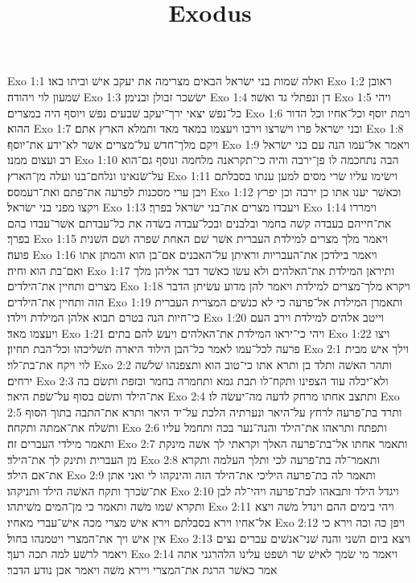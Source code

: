 

\title{Exodus}

Exo 1:1  ואלה שׁמות בני ישׂראל הבאים מצרימה את יעקב אישׁ וביתו באו׃
Exo 1:2  ראובן שׁמעון לוי ויהודה׃
Exo 1:3  ישׂשכר זבולן ובנימן׃
Exo 1:4  דן ונפתלי גד ואשׁר׃
Exo 1:5  ויהי כל־נפשׁ יצאי ירך־יעקב שׁבעים נפשׁ ויוסף היה במצרים׃
Exo 1:6  וימת יוסף וכל־אחיו וכל הדור ההוא׃
Exo 1:7  ובני ישׂראל פרו וישׁרצו וירבו ויעצמו במאד מאד ותמלא הארץ אתם׃
Exo 1:8  ויקם מלך־חדשׁ על־מצרים אשׁר לא־ידע את־יוסף׃
Exo 1:9  ויאמר אל־עמו הנה עם בני ישׂראל רב ועצום ממנו׃
Exo 1:10  הבה נתחכמה לו פן־ירבה והיה כי־תקראנה מלחמה ונוסף גם־הוא על־שׂנאינו ונלחם־בנו ועלה מן־הארץ׃
Exo 1:11  וישׂימו עליו שׂרי מסים למען ענתו בסבלתם ויבן ערי מסכנות לפרעה את־פתם ואת־רעמסס׃
Exo 1:12  וכאשׁר יענו אתו כן ירבה וכן יפרץ ויקצו מפני בני ישׂראל׃
Exo 1:13  ויעבדו מצרים את־בני ישׂראל בפרך׃
Exo 1:14  וימררו את־חייהם בעבדה קשׁה בחמר ובלבנים ובכל־עבדה בשׂדה את כל־עבדתם אשׁר־עבדו בהם בפרך׃
Exo 1:15  ויאמר מלך מצרים למילדת העברית אשׁר שׁם האחת שׁפרה ושׁם השׁנית פועה׃
Exo 1:16  ויאמר בילדכן את־העבריות וראיתן על־האבנים אם־בן הוא והמתן אתו ואם־בת הוא וחיה׃
Exo 1:17  ותיראן המילדת את־האלהים ולא עשׂו כאשׁר דבר אליהן מלך מצרים ותחיין את־הילדים׃
Exo 1:18  ויקרא מלך־מצרים למילדת ויאמר להן מדוע עשׂיתן הדבר הזה ותחיין את־הילדים׃
Exo 1:19  ותאמרן המילדת אל־פרעה כי לא כנשׁים המצרית העברית כי־חיות הנה בטרם תבוא אלהן המילדת וילדו׃
Exo 1:20  וייטב אלהים למילדת וירב העם ויעצמו מאד׃
Exo 1:21  ויהי כי־יראו המילדת את־האלהים ויעשׂ להם בתים׃
Exo 1:22  ויצו פרעה לכל־עמו לאמר כל־הבן הילוד היארה תשׁליכהו וכל־הבת תחיון׃
Exo 2:1  וילך אישׁ מבית לוי ויקח את־בת־לוי׃
Exo 2:2  ותהר האשׁה ותלד בן ותרא אתו כי־טוב הוא ותצפנהו שׁלשׁה ירחים׃
Exo 2:3  ולא־יכלה עוד הצפינו ותקח־לו תבת גמא ותחמרה בחמר ובזפת ותשׂם בה את־הילד ותשׂם בסוף על־שׂפת היאר׃
Exo 2:4  ותתצב אחתו מרחק לדעה מה־יעשׂה לו׃
Exo 2:5  ותרד בת־פרעה לרחץ על־היאר ונערתיה הלכת על־יד היאר ותרא את־התבה בתוך הסוף ותשׁלח את־אמתה ותקחה׃
Exo 2:6  ותפתח ותראהו את־הילד והנה־נער בכה ותחמל עליו ותאמר מילדי העברים זה׃
Exo 2:7  ותאמר אחתו אל־בת־פרעה האלך וקראתי לך אשׁה מינקת מן העברית ותינק לך את־הילד׃
Exo 2:8  ותאמר־לה בת־פרעה לכי ותלך העלמה ותקרא את־אם הילד׃
Exo 2:9  ותאמר לה בת־פרעה היליכי את־הילד הזה והינקהו לי ואני אתן את־שׂכרך ותקח האשׁה הילד ותניקהו׃
Exo 2:10  ויגדל הילד ותבאהו לבת־פרעה ויהי־לה לבן ותקרא שׁמו משׁה ותאמר כי מן־המים משׁיתהו׃
Exo 2:11  ויהי בימים ההם ויגדל משׁה ויצא אל־אחיו וירא בסבלתם וירא אישׁ מצרי מכה אישׁ־עברי מאחיו׃
Exo 2:12  ויפן כה וכה וירא כי אין אישׁ ויך את־המצרי ויטמנהו בחול׃
Exo 2:13  ויצא ביום השׁני והנה שׁני־אנשׁים עברים נצים ויאמר לרשׁע למה תכה רעך׃
Exo 2:14  ויאמר מי שׂמך לאישׁ שׂר ושׁפט עלינו הלהרגני אתה אמר כאשׁר הרגת את־המצרי ויירא משׁה ויאמר אכן נודע הדבר׃
